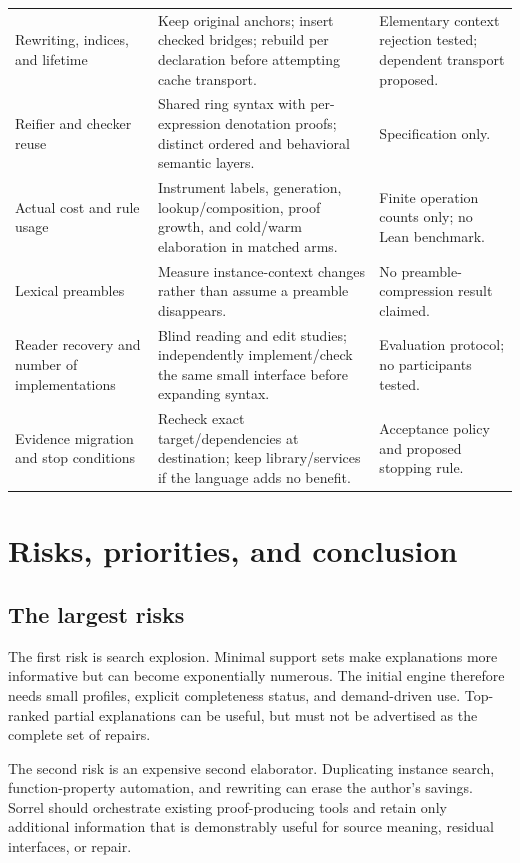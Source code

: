\documentclass[11pt,a4paper]{article}
\numberwithin{equation}{section}
\theoremstyle{definition}\newtheorem{definition}[theorem]{Definition}
\theoremstyle{remark}\newtheorem{remark}[theorem]{Remark}
\begin{document}
\begin{center}
\begin{longtable}{@{}P{34mm}P{70mm}P{39mm}@{}}
Rewriting, indices, and lifetime & Keep original anchors; insert checked bridges; rebuild per declaration before attempting cache transport. & Elementary context rejection tested; dependent transport proposed.\\
Reifier and checker reuse & Shared ring syntax with per-expression denotation proofs; distinct ordered and behavioral semantic layers. & Specification only.\\
Actual cost and rule usage & Instrument labels, generation, lookup/composition, proof growth, and cold/warm elaboration in matched arms. & Finite operation counts only; no Lean benchmark.\\
Lexical preambles & Measure instance-context changes rather than assume a preamble disappears. & No preamble-compression result claimed.\\
Reader recovery and number of implementations & Blind reading and edit studies; independently implement/check the same small interface before expanding syntax. & Evaluation protocol; no participants tested.\\
Evidence migration and stop conditions & Recheck exact target/dependencies at destination; keep library/services if the language adds no benefit. & Acceptance policy and proposed stopping rule.\\\bottomrule
\end{longtable}
\end{center}

\section{Risks, priorities, and conclusion}\label{sec:conclusion}

\subsection{The largest risks}
The first risk is search explosion. Minimal support sets make explanations
more informative but can become exponentially numerous. The initial engine
therefore needs small profiles, explicit completeness status, and demand-driven
use. Top-ranked partial explanations can be useful, but must not be advertised
as the complete set of repairs.

The second risk is an expensive second elaborator. Duplicating instance search,
function-property automation, and rewriting can erase the author's savings.
Sorrel should orchestrate existing proof-producing tools and retain only
additional information that is demonstrably useful for source meaning,
residual interfaces, or repair.
\end{document}
